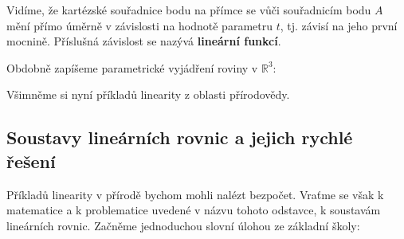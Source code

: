       
    
    Vidíme, že kartézské souřadnice bodu na přímce se vůči souřadnicím bodu \(A\) mění přímo 
    úměrně v závislosti na hodnotě parametru \(t\), tj. závisí na jeho první mocnině. Příslušná 
    závislost se nazývá \textbf{lineární funkcí}.
    
    Obdobně zapíšeme parametrické vyjádření roviny v \(\mathbb{R}^3\):
    
    
    
    Všimněme si nyní příkladů linearity z oblasti přírodovědy.
    
    

    
    
  \subsection{Soustavy lineárních rovnic a jejich rychlé řešení}
    Příkladů linearity v přírodě bychom mohli nalézt bezpočet. Vraťme se však k matematice a k 
    problematice uvedené v názvu tohoto odstavce, k soustavám lineárních rovnic. Začněme 
    jednoduchou slovní úlohou ze základní školy:
    
    
    
